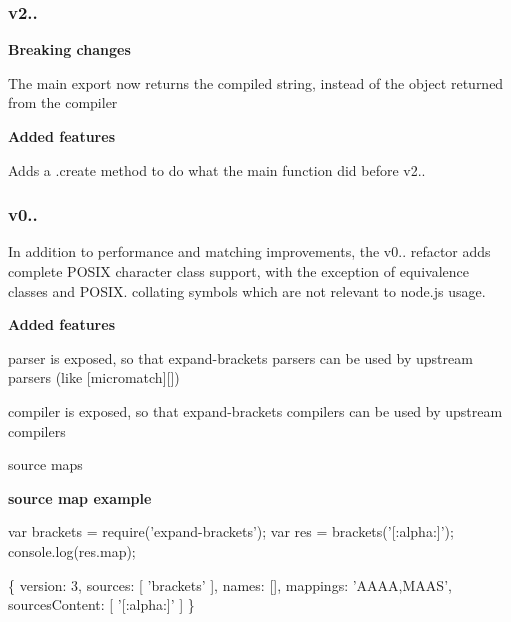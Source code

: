 \subsubsection*{v2..}

{\bfseries Breaking changes}


\begin{DoxyItemize}
\item The main export now returns the compiled string, instead of the object returned from the compiler
\end{DoxyItemize}

{\bfseries Added features}


\begin{DoxyItemize}
\item Adds a {\ttfamily .create} method to do what the main function did before v2..
\end{DoxyItemize}

\subsubsection*{v0..}

In addition to performance and matching improvements, the v0.. refactor adds complete P\+O\+S\+IX character class support, with the exception of equivalence classes and P\+O\+S\+I\+X. collating symbols which are not relevant to node.\+js usage.

{\bfseries Added features}


\begin{DoxyItemize}
\item parser is exposed, so that expand-\/brackets parsers can be used by upstream parsers (like \mbox{[}micromatch\mbox{]}\mbox{[}\mbox{]})
\item compiler is exposed, so that expand-\/brackets compilers can be used by upstream compilers
\item source maps
\end{DoxyItemize}

{\bfseries source map example}


\begin{DoxyCode}
var brackets = require('expand-brackets');
var res = brackets('[:alpha:]');
console.log(res.map);

\{ version: 3,
     sources: [ 'brackets' ],
     names: [],
     mappings: 'AAAA,MAAS',
     sourcesContent: [ '[:alpha:]' ] \}
\end{DoxyCode}
 